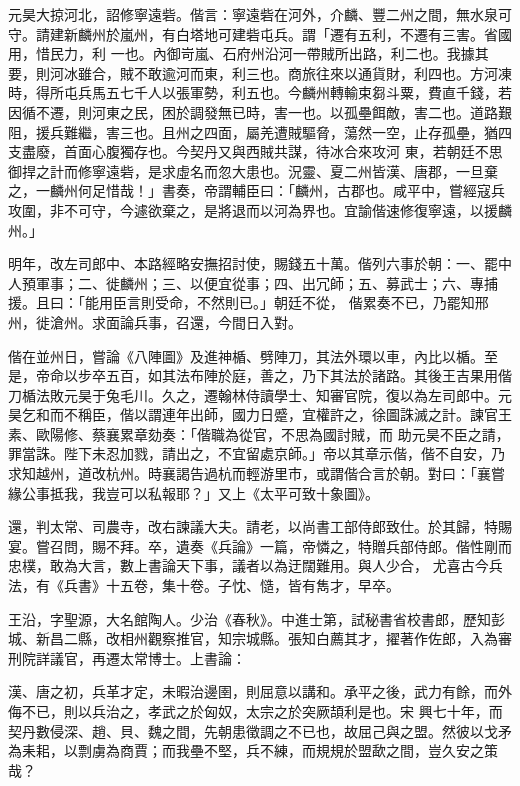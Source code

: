 \begin{pinyinscope}
 元昊大掠河北，詔修寧遠砦。偕言：寧遠砦在河外，介麟、豐二州之間，無水泉可守。請建新麟州於嵐州，有白塔地可建砦屯兵。謂「遷有五利，不遷有三害。省國用，惜民力，利
 一也。內御岢嵐、石府州沿河一帶賊所出路，利二也。我據其要，則河冰雖合，賊不敢逾河而東，利三也。商旅往來以通貨財，利四也。方河凍時，得所屯兵馬五七千人以張軍勢，利五也。今麟州轉輸束芻斗粟，費直千錢，若因循不遷，則河東之民，困於調發無已時，害一也。以孤壘餌敵，害二也。道路艱阻，援兵難繼，害三也。且州之四面，屬羌遭賊驅脅，蕩然一空，止存孤壘，猶四支盡廢，首面心腹獨存也。今契丹又與西賊共謀，待冰合來攻河
 東，若朝廷不思御捍之計而修寧遠砦，是求虛名而忽大患也。況靈、夏二州皆漢、唐郡，一旦棄之，一麟州何足惜哉！」書奏，帝謂輔臣曰：「麟州，古郡也。咸平中，嘗經寇兵攻圍，非不可守，今遽欲棄之，是將退而以河為界也。宜諭偕速修復寧遠，以援麟州。」



 明年，改左司郎中、本路經略安撫招討使，賜錢五十萬。偕列六事於朝：一、罷中人預軍事；二、徙麟州；三、以便宜從事；四、出冗師；五、募武士；六、專捕援。且曰：「能用臣言則受命，不然則已。」朝廷不從，
 偕累奏不已，乃罷知邢州，徙滄州。求面論兵事，召還，今間日入對。



 偕在並州日，嘗論《八陣圖》及進神楯、劈陣刀，其法外環以車，內比以楯。至是，帝命以步卒五百，如其法布陣於庭，善之，乃下其法於諸路。其後王吉果用偕刀楯法敗元昊于兔毛川。久之，遷翰林侍讀學士、知審官院，復以為左司郎中。元昊乞和而不稱臣，偕以謂連年出師，國力日蹙，宜權許之，徐圖誅滅之計。諫官王素、歐陽修、蔡襄累章劾奏：「偕職為從官，不思為國討賊，而
 助元昊不臣之請，罪當誅。陛下未忍加戮，請出之，不宜留處京師。」帝以其章示偕，偕不自安，乃求知越州，道改杭州。時襄謁告過杭而輕游里市，或謂偕合言於朝。對曰：「襄嘗緣公事抵我，我豈可以私報耶？」又上《太平可致十象圖》。



 還，判太常、司農寺，改右諫議大夫。請老，以尚書工部侍郎致仕。於其歸，特賜宴。嘗召問，賜不拜。卒，遺奏《兵論》一篇，帝憐之，特贈兵部侍郎。偕性剛而忠樸，敢為大言，數上書論天下事，議者以為迂闊難用。與人少合，
 尤喜古今兵法，有《兵書》十五卷，集十卷。子忱、慥，皆有雋才，早卒。



 王沿，字聖源，大名館陶人。少治《春秋》。中進士第，試秘書省校書郎，歷知彭城、新昌二縣，改相州觀察推官，知宗城縣。張知白薦其才，擢著作佐郎，入為審刑院詳議官，再遷太常博士。上書論：



 漢、唐之初，兵革才定，未暇治邊圉，則屈意以講和。承平之後，武力有餘，而外侮不已，則以兵治之，孝武之於匈奴，太宗之於突厥頡利是也。宋
 興七十年，而契丹數侵深、趙、貝、魏之間，先朝患徵調之不已也，故屈己與之盟。然彼以戈矛為耒耜，以剽虜為商賈；而我壘不堅，兵不練，而規規於盟歃之間，豈久安之策哉？




\end{pinyinscope}
